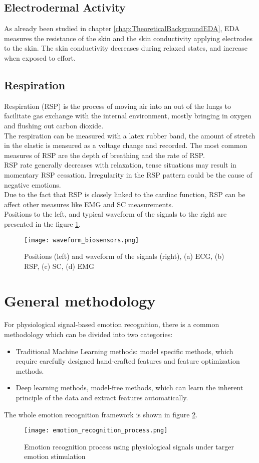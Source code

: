 \subsection{Electrodermal Activity}
As already been studied in chapter \ref{chap:TheoreticalBackgroundEDA}, EDA measures the resistance of the skin and the skin conductivity applying electrodes to the skin. The skin conductivity decreases during relaxed states, and increase when exposed to effort.

\subsection{Respiration}
Respiration (RSP) is the process of moving air into an out of the lungs to facilitate gas exchange with the internal environment, mostly bringing in oxygen and flushing out carbon dioxide.
\\
The respiration can be measured with a latex rubber band, the amount of stretch in the elastic is measured as a voltage change and recorded. The most common measures of RSP are the depth of breathing and the rate of RSP.
\\ \indent
RSP rate generally decreases with relaxation, tense situations may result in momentary RSP cessation. Irregularity in the RSP pattern could be the cause of negative emotions.
\\
Due to the fact that RSP is closely linked to the cardiac function, RSP can be affect other measures like EMG and SC measurements.
\\
Positions to the left, and typical waveform of the signals to the right are presented in the figure \ref{fig:waveform_biosensors}.
\begin{figure}[h]
    \centering
    \texttt{[image: waveform\_biosensors.png]} 
	\caption{Positions (left) and waveform of the signals (right), (a) ECG, (b) RSP, (c) SC, (d) EMG}
    \label{fig:waveform_biosensors}
\end{figure}

\section{General methodology}
For physiological signal-based emotion recognition, there is a common methodology which can be divided into two categories:
\begin{itemize}
	\item Traditional Machine Learning methods: model specific methods, which require carefully designed hand-crafted features and feature optimization methods.
	\item Deep learning methods, model-free methods, which can learn the inherent principle of the data and extract features automatically.
\end{itemize}
The whole emotion recognition framework is shown in figure \ref{fig:emotion_recognition_process}.
\begin{figure}[h]
    \centering
    \texttt{[image: emotion\_recognition\_process.png]} 
	\caption{Emotion recognition process using physiological signals under targer emotion stimulation}
    \label{fig:emotion_recognition_process}
\end{figure}

